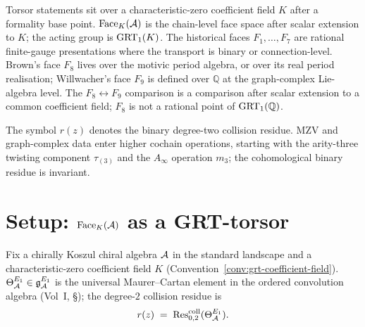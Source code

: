 \begin{convention}
\label{conv:grt-coefficient-field}
%
%
Torsor statements sit over a characteristic-zero coefficient
field $K$ after a formality base point. $\mathrm{Face}_K(\mathcal{A})$ is the
chain-level face space after scalar extension to $K$; the acting
group is $\mathrm{GRT}_1(K)$. The historical faces $F_1,\ldots,F_7$ are
rational finite-gauge presentations where the transport is
binary or connection-level. Brown's face $F_8$ lives over the
motivic period algebra, or over its real period realisation;
Willwacher's face $F_9$ is defined over $\mathbb Q$ at the
graph-complex Lie-algebra level. The
$F_8\leftrightarrow F_9$ comparison is a comparison after scalar
extension to a common coefficient field; $F_8$ is not a rational
point of $\mathrm{GRT}_1(\mathbb Q)$.

The symbol $r(z)$ denotes the binary degree-two collision
residue. MZV and graph-complex data enter higher cochain
operations, starting with the arity-three twisting component
$\tau_{(3)}$ and the $A_\infty$ operation $m_3$; the cohomological
binary residue is invariant.
\end{convention}

\section{Setup: \texorpdfstring{$\mathrm{Face}_K(\mathcal{A})$}{Face_K(A)} as a GRT-torsor}
\label{sec:grt-setup}

Fix a chirally Koszul chiral algebra $\mathcal{A}$ in the standard
landscape and a characteristic-zero coefficient field $K$
(Convention~\ref{conv:grt-coefficient-field}).
$\Theta_{\mathcal{A}}^{E_1}\in\mathfrak{g}^{E_1}_{\mathcal{A}}$ is the universal
Maurer--Cartan element in the ordered convolution algebra (Vol~I,
\S{}); the degree-$2$ collision residue is
\[
 r(z) \;=\; \operatorname{Res}^{\mathrm{coll}}_{0,2}(\Theta_{\mathcal{A}}^{E_1}).
\]

